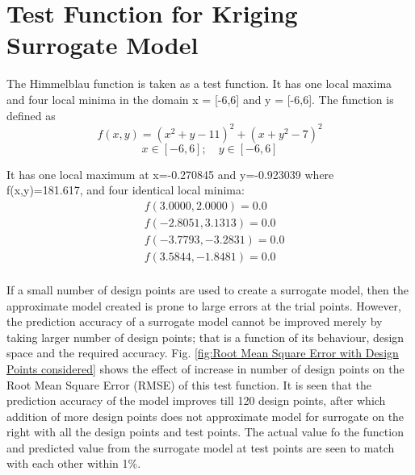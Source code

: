 \section{Test Function for Kriging Surrogate Model}
\label{test function}
The Himmelblau function is taken as a test function.  It has one local maxima and four local minima in the domain x = [-6,6] and y = [-6,6]. The function is defined as 
\begin{equation}
f(x,y) = (x^2 + y - 11)^2  + (x + y^2 - 7)^2 
\end{equation}
\begin{equation}
x \in [-6,6] ;\quad y \in [-6,6]
\end{equation}

It has one local maximum at x=-0.270845 and y=-0.923039 where f(x,y)=181.617, and four identical local minima:
\begin{align}
&f( 3.0000 , 2.0000 )=0.0 \\
&f( -2.8051 , 3.1313 )=0.0 \\
&f( -3.7793 , -3.2831 )=0.0 \\
&f( 3.5844 , -1.8481 )=0.0 \\
\end{align}

If a small number of design points are used to create a surrogate model, then the approximate model created is prone to large errors at the trial points. However, the prediction accuracy of a surrogate model cannot be improved merely by taking larger number of design points; that is a function of its behaviour, design space and the required accuracy. Fig. \ref{fig:Root Mean Square Error with Design Points considered} shows the effect of increase in number of design points on the Root Mean Square Error (RMSE) of this test function. It is seen that the prediction accuracy of the model improves till 120 design points, after which addition of more design points does not approximate model for surrogate on the right with all the design points and test points. The actual value fo the function and predicted value from the surrogate model at test points are seen to match with each other within 1\%.

